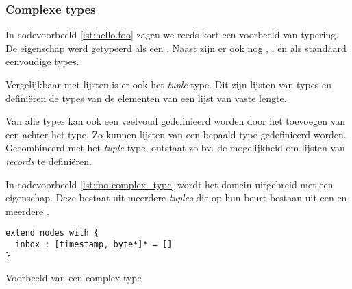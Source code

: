 \subsubsection{Complexe types}

In codevoorbeeld \ref{lst:hello.foo} zagen we reeds kort een voorbeeld van typering.
De  eigenschap werd getypeerd als een . Naast
 zijn er ook nog , ,  en
 als standaard eenvoudige types.

Vergelijkbaar met lijsten is er ook het \emph{tuple} type. Dit zijn lijsten van
types en defini\"eren de types van de elementen van een lijst van vaste lengte.

Van alle types kan ook een veelvoud gedefinieerd worden door het toevoegen van
een \ttt{*} achter het type. Zo kunnen lijsten van een bepaald type
gedefinieerd worden. Gecombineerd met het \emph{tuple} type, ontstaat zo bv. de
mogelijkheid om lijsten van \emph{records} te defini\"eren.

In codevoorbeeld \ref{lst:foo-complex_type} wordt het  domein uitgebreid
met een  eigenschap. Deze bestaat uit meerdere \emph{tuples} die op
hun beurt bestaan uit een  en meerdere .

\begin{listing}[ht]
  \begin{verbatim}
extend nodes with {
  inbox : [timestamp, byte*]* = []
}
  \end{verbatim}
  \vspace{-5mm}
  \caption{Voorbeeld van een complex type}
  \label{lst:foo-complex_type}
\end{listing}
